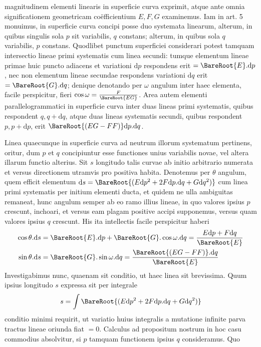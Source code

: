 %
magnitudinem elementi linearis in superficie curva exprimit, atque ante omnia significationem geometricam coëfficientium \(E,F,G\) examinemus. Iam in art. 5 monuimus, in superficie curva concipi posse duo systemata linearum, alterum, in quibus singulis sola \(p\) sit variabilis, \(q\) constans; alterum, in quibus sola \(q\) variabilis, \(p\) constans. Quodlibet punctum superficiei considerari potest tamquam intersectio lineae primi systematis cum linea secundi: tumque elementum lineae primae huic puncto adiacens et variationi \(\mathrm{d}p\) respondens erit \(=\BareRoot{E}\mathord{.}\mathrm{d}p\), nec non elementum lineae secundae respondens variationi \(\mathrm{d}q\) erit \(=\BareRoot{G}\mathord{.}\mathrm{d}q\); denique denotando per \(\omega\) angulum inter haec elementa, facile perspicitur, fieri \(\cos\omega=\frac{F}{\BareRoot{EG}}\). Area autem elementi parallelogrammatici in superficie curva inter duas lineas primi systematis, quibus respondent \(q,q+\mathrm{d}q\), atque duas lineas systematis secundi, quibus respondent \(p,p+\mathrm{d}p\), erit \(\BareRoot{(EG-FF)}\mathrm{d}p\mathord{.}\mathrm{d}q\).

Linea quaecunque in superficie curva ad neutrum illorum systematum pertinens, oritur, dum \(p\) et \(q\) concipiuntur esse functiones unius variabilis novae, vel altera illarum functio alterius. Sit \(s\) longitudo talis curvae ab initio arbitrario numerata et versus directionem utramvis pro positiva habita. Denotemus per \(\theta\) angulum, quem efficit elementum \(\mathrm{d}s=\BareRoot{(E\mathrm{d}p^2+2F\mathrm{d}p\mathord{.}\mathrm{d}q+G\mathrm{d}q^2)}\) cum linea primi systematis per initium elementi ducta, et quidem ne ulla ambiguitas remaneat, hunc angulum semper ab eo ramo illius lineae, in quo valores ipsius \(p\) crescunt, inchoari, et versus eam plagam positive accipi supponemus, versus quam valores ipsius \(q\) crescunt. His ita intellectis facile perspicitur haberi
\[
\begin{aligned}
\cos\theta\mathord{.}\mathrm{d}s&=\BareRoot{E}\mathord{.}\mathrm{d}p+\BareRoot{G}\mathord{.}\cos\omega\mathord{.}\mathrm{d}q=\frac{E\mathrm{d}p+F\mathrm{d}q}{\BareRoot{E}}\\
\sin\theta\mathord{.}\mathrm{d}s&=\BareRoot{G}\mathord{.}\sin\omega\mathord{.}\mathrm{d}q=\frac{\BareRoot{(EG-FF)}\mathord{.}\mathrm{d}q}{\BareRoot{E}}
\end{aligned}
\]
Investigabimus nunc, quaenam sit conditio, ut haec linea sit brevissima. Quum ipsius longitudo \(s\) expressa sit per integrale
\[
s=\int\BareRoot{(E\mathrm{d}p^2+2F\mathrm{d}p\mathord{.}\mathrm{d}q+G\mathrm{d}q^2)}
\]
conditio minimi requirit, ut variatio huius integralis a mutatione infinite parva tractus lineae oriunda fiat \(=0\). Calculus ad propositum nostrum in hoc casu commodius absolvitur, si \(p\) tamquam functionem ipsius \(q\) consideramus. Quo
